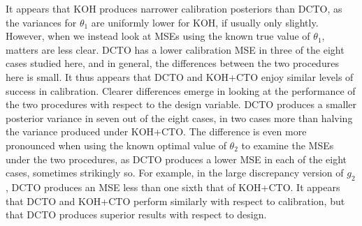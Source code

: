 \documentclass[12pt]{article}
\begin{document}
%
It appears that KOH produces narrower calibration posteriors than DCTO, as the variances for $\theta_1$ are uniformly lower for KOH, if usually only slightly.
%
However, when we instead look at MSEs using the known true value of $\theta_1$, matters are less clear.
%
DCTO has a lower calibration MSE in three of the eight cases studied here, and in general, the differences between the two procedures here is small.
%
It thus appears that DCTO and KOH+CTO enjoy similar levels of success in calibration.
%
Clearer differences emerge in looking at the performance of the two procedures with respect to the design variable.
%
DCTO produces a smaller posterior variance in seven out of the eight cases, in two cases more than halving the variance produced under KOH+CTO.
%
The difference is even more pronounced when using the known optimal value of $\theta_2$ to examine the MSEs under the two procedures, as DCTO produces a lower MSE in each of the eight cases, sometimes strikingly so.
%
For example, in the large discrepancy version of $g_2$, DCTO produces an MSE less than one sixth that of KOH+CTO.
%
It appears that DCTO and KOH+CTO perform similarly with respect to calibration, but that DCTO produces superior results with respect to design.

\bigskip

%
%
%
%




\end{document}
